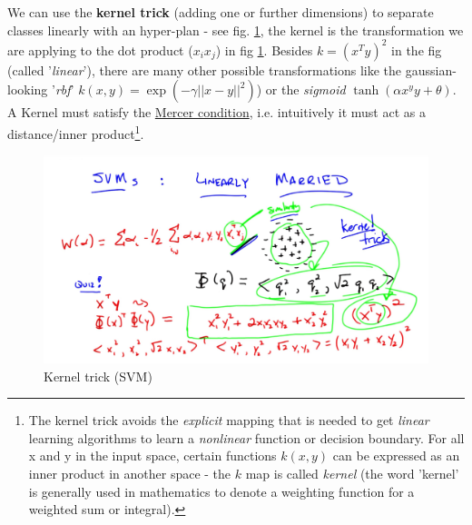 \documentclass[11pt]{article}
\begin{document}
We can use the \textbf{kernel trick} (adding one or further dimensions) to separate classes linearly with an hyper-plan - see fig. \ref{kernel_trick}, the kernel is the transformation we are applying to the dot product ($x_i x_j$) in fig \ref{kernel_trick}. Besides $k = (x^T y)^2$ in the fig (called '\textit{linear}'), there are many other possible transformations like the gaussian-looking '\textit{rbf}' $k(x,y)= \exp(-\gamma ||x-y||^2)$) or the \textit{sigmoid} $\tanh(\alpha x^y y + \theta)$. A Kernel must satisfy the \underline{Mercer condition}, i.e. intuitively it must act as a distance/inner product\footnote{The kernel trick avoids the \textit{explicit} mapping that is needed to get \textit{linear} learning algorithms to learn a \textit{nonlinear} function or decision boundary. For all x and y in the input space, certain functions $k(x,y)$ can be expressed as an inner product in another space - the $k$ map is called \textit{kernel} (the word 'kernel' is generally used in mathematics to denote a weighting function for a weighted sum or integral).}. 

\begin{figure}[htbp] 
	\centering
	\includegraphics[width=.9\textwidth]{pics/kernel_trick}
	\caption{Kernel trick (SVM)} 
	\label{kernel_trick}
\end{figure}
\end{document}
